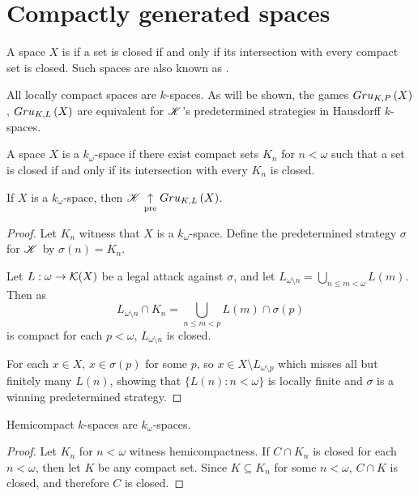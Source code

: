 \section{Compactly generated spaces}

\begin{defn}
  A space $X$ is  if a set is closed if and
  only if its intersection with every compact set is closed. Such
  spaces are also known as .
\end{defn}

All locally compact spaces are $k$-spaces. As will be shown,
the games $Gru_{K,P}\left({X}\right)$, $Gru_{K,L}\left({X}\right)$ are equivalent for $\mathscr{K}$'s
predetermined strategies in Hausdorff $k$-spaces.

\begin{defn}
  A space $X$ is a $k_\omega$-space if there exist compact sets $K_n$ for
  $n<\omega$ such that a set is closed if and
  only if its intersection with every $K_n$ is closed.
\end{defn}

\begin{thm}
  If $X$ is a $k_\omega$-space, then
  $\mathscr{K} \underset{\text{pre}}{\uparrow} Gru_{K,L}\left({X}\right)$.
\end{thm}

\begin{proof}
  Let $K_n$ witness that $X$ is a $k_\omega$-space. Define the predetermined
  strategy $\sigma$ for $\mathscr{K}$ by $\sigma(n)=K_n$.

  Let $L:\omega\to\mathcal{K}(X)$ be a legal attack against $\sigma$, and let
  $L_{\omega\setminus n} = \bigcup_{n\leq m<\omega}L(m)$. Then as
    \[
      L_{\omega\setminus n}\cap K_n
        =
      \bigcup_{n\leq m< p}L(m) \cap \sigma(p)
    \]
  is compact for each $p<\omega$, $L_{\omega\setminus n}$ is closed.

  For each $x\in X$, $x\in \sigma(p)$ for some $p$, so
  $x\in X\setminus L_{\omega\setminus p}$ which misses all but finitely
  many $L(n)$, showing that $\{L(n):n<\omega\}$ is locally finite and
  $\sigma$ is a winning predetermined strategy.
\end{proof}

\begin{prop}
  Hemicompact $k$-spaces are $k_\omega$-spaces.
\end{prop}

\begin{proof}
  Let $K_n$ for $n<\omega$ witness hemicompactness.
  If $C\cap K_n$ is closed for each $n<\omega$, then let $K$ be any compact
  set. Since $K\subseteq K_n$ for some $n<\omega$, $C\cap K$ is closed, and
  therefore $C$ is closed.
\end{proof}

